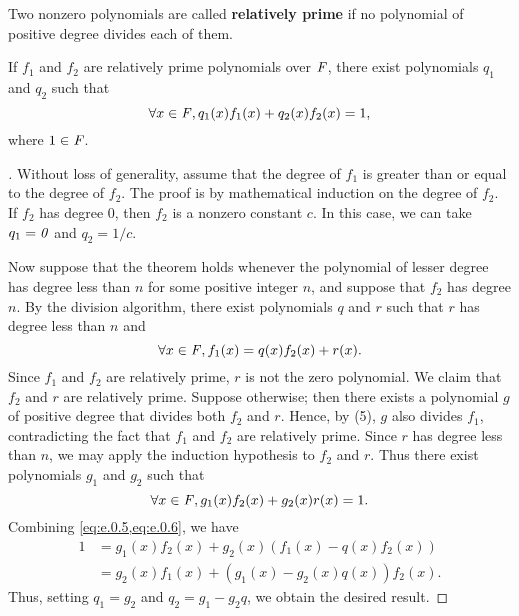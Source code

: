 \begin{defn}\label{e.0.6}
	Two nonzero polynomials are called \textbf{relatively prime} if no polynomial of positive degree divides each of them.
\end{defn}

\begin{thm}\label{e.2}
	If \(f_1\) and \(f_2\) are relatively prime polynomials over \(\mathit{F}\), there exist polynomials \(q_1\) and \(q_2\) such that
	\[
		\forall x \in \mathit{F}, q_1(x) f_1(x) + q_2(x) f_2(x) = 1,
	\]
	where \(1 \in \mathit{F}\).
\end{thm}

\begin{proof}[]
	Without loss of generality, assume that the degree of \(f_1\) is greater than or equal to the degree of \(f_2\).
	The proof is by mathematical induction on the degree of \(f_2\).
	If \(f_2\) has degree \(0\), then \(f_2\) is a nonzero constant \(c\).
	In this case, we can take \(q_1 = \mathit{0}\) and \(q_2 = 1 / c\).

	Now suppose that the theorem holds whenever the polynomial of lesser degree has degree less than \(n\) for some positive integer \(n\), and suppose that \(f_2\) has degree \(n\).
	By the division algorithm, there exist polynomials \(q\) and \(r\) such that \(r\) has degree less than \(n\) and
	\begin{equation}\label{eq:e.0.5}
		\forall x \in \mathit{F}, f_1(x) = q(x) f_2(x) + r(x).
	\end{equation}
	Since \(f_1\) and \(f_2\) are relatively prime, \(r\) is not the zero polynomial.
	We claim that \(f_2\) and \(r\) are relatively prime.
	Suppose otherwise;
	then there exists a polynomial \(g\) of positive degree that divides both \(f_2\) and \(r\).
	Hence, by (5), \(g\) also divides \(f_1\), contradicting the fact that \(f_1\) and \(f_2\) are relatively prime.
	Since \(r\) has degree less than \(n\), we may apply the induction hypothesis to \(f_2\) and \(r\).
	Thus there exist polynomials \(g_1\) and \(g_2\) such that
	\begin{equation}\label{eq:e.0.6}
		\forall x \in \mathit{F}, g_1(x) f_2(x) + g_2(x) r(x) = 1.
	\end{equation}
	Combining \cref{eq:e.0.5,eq:e.0.6}, we have
	\begin{align*}
		1 & = g_1(x) f_2(x) + g_2(x) (f_1(x) - q(x) f_2(x))  \\
		  & = g_2(x) f_1(x) + (g_1(x) - g_2(x) q(x)) f_2(x).
	\end{align*}
	Thus, setting \(q_1 = g_2\) and \(q_2 = g_1 - g_2 q\), we obtain the desired result.
\end{proof}


